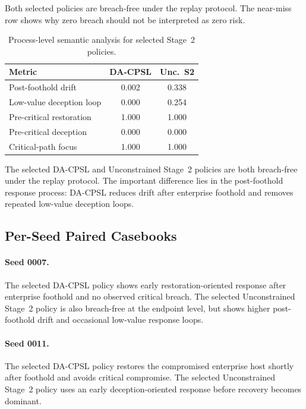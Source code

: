 \documentclass[sigconf,review,anonymous]{acmart}
\begin{document}
Both selected policies are breach-free under the replay protocol. The
near-miss row shows why zero breach should not be interpreted as zero
risk.

\begin{table}[!htbp]
\centering
\caption{Process-level semantic analysis for selected Stage~2 policies.}
\label{tab:app-rq3-process-analysis}
\begingroup
\small
\setlength{\tabcolsep}{4pt}
\renewcommand{\arraystretch}{1.10}
\begin{tabular*}{\columnwidth}{@{\extracolsep{\fill}}lcc@{}}
\toprule
Metric & DA-CPSL & Unc.~S2 \\
\midrule
Post-foothold drift & 0.002 & 0.338 \\
Low-value deception loop & 0.000 & 0.254 \\
Pre-critical restoration & 1.000 & 1.000 \\
Pre-critical deception & 0.000 & 0.000 \\
Critical-path focus & 1.000 & 1.000 \\
\bottomrule
\end{tabular*}
\endgroup
\end{table}

The selected DA-CPSL and Unconstrained Stage~2 policies are both
breach-free under the replay protocol. The important difference lies in
the post-foothold response process: DA-CPSL reduces drift after enterprise
foothold and removes repeated low-value deception loops.

\subsection{Per-Seed Paired Casebooks}
\label{app:per-seed-casebooks}

\paragraph{Seed 0007.}
The selected DA-CPSL policy shows early restoration-oriented response
after enterprise foothold and no observed critical breach. The selected
Unconstrained Stage~2 policy is also breach-free at the endpoint level,
but shows higher post-foothold drift and occasional low-value response
loops.

\paragraph{Seed 0011.}
The selected DA-CPSL policy restores the compromised enterprise host
shortly after foothold and avoids critical compromise. The selected
Unconstrained Stage~2 policy uses an early deception-oriented response
before recovery becomes dominant.
\end{document}
